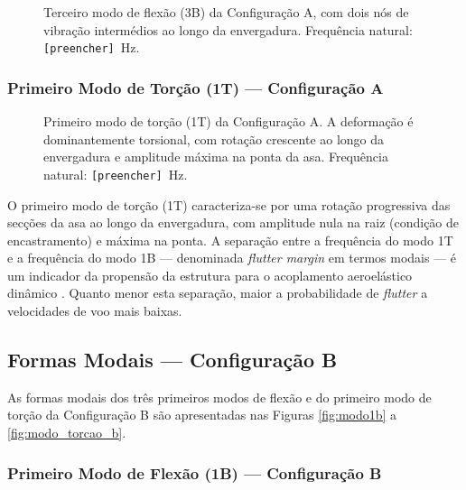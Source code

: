 \documentclass[a4paper,fleqn,noprintline]{cas-dc}
\begin{document}
\begin{figure}[h!]
    \centering
    \caption{Terceiro modo de flexão (3B) da Configuração A, 
    com dois nós de vibração intermédios ao longo da 
    envergadura. Frequência natural: 
    \texttt{[preencher]}~\si{\hertz}.}
    \label{fig:modo3a}
\end{figure}

\subsubsection{Primeiro Modo de Torção (1T) --- Configuração A}

\begin{figure}[h!]
    \centering
    \caption{Primeiro modo de torção (1T) da Configuração A. 
    A deformação é dominantemente torsional, com rotação 
    crescente ao longo da envergadura e amplitude máxima 
    na ponta da asa. Frequência natural: 
    \texttt{[preencher]}~\si{\hertz}.}
    \label{fig:modo_torcao_a}
\end{figure}

O primeiro modo de torção (1T) caracteriza-se por uma rotação progressiva das secções da asa ao longo da envergadura, com amplitude nula na raiz (condição de encastramento) e máxima na ponta. A separação entre a frequência do modo 1T e a frequência do modo 1B --- denominada \textit{flutter margin} em termos modais --- é um indicador da propensão da estrutura para o acoplamento aeroelástico dinâmico \cite{Fung1993, Dowell2004}. Quanto menor esta separação, maior a probabilidade de \textit{flutter} a velocidades de voo mais baixas.

\subsection{Formas Modais --- Configuração B}

As formas modais dos três primeiros modos de flexão e do primeiro modo de torção da Configuração B são apresentadas nas Figuras \ref{fig:modo1b} a \ref{fig:modo_torcao_b}.

\subsubsection{Primeiro Modo de Flexão (1B) --- Configuração B}
\end{document}
